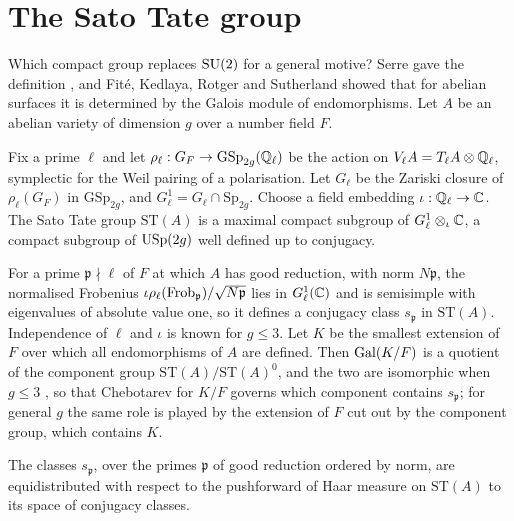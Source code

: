 \section{The Sato Tate group}\label{sec:ch3stgroup}

Which compact group replaces $\mathrm{SU}(2)$ for a general motive? Serre gave the definition \cite{serre2012}, and Fité, Kedlaya, Rotger and Sutherland \cite{fkrs2012} showed that for abelian surfaces it is determined by the Galois module of endomorphisms. Let $A$ be an abelian variety of dimension $g$ over a number field $F$.

\begin{definition}[Serre]\label{def:ch3stgroup}
Fix a prime $\ell$ and let $\rho_\ell:G_F\to\mathrm{GSp}_{2g}(\mathbb{Q}_\ell)$ be the action on $V_\ell A=T_\ell A\otimes\mathbb{Q}_\ell$, symplectic for the Weil pairing of a polarisation. Let $G_\ell$ be the Zariski closure of $\rho_\ell(G_F)$ in $\mathrm{GSp}_{2g}$, and $G^1_\ell=G_\ell\cap\mathrm{Sp}_{2g}$. Choose a field embedding $\iota:\mathbb{Q}_\ell\to\mathbb{C}$. The Sato Tate group $\mathrm{ST}(A)$ is a maximal compact subgroup of $G^1_\ell\otimes_\iota\mathbb{C}$, a compact subgroup of $\mathrm{USp}(2g)$ well defined up to conjugacy.
\end{definition}

For a prime $\mathfrak{p}\nmid\ell$ of $F$ at which $A$ has good reduction, with norm $N\mathfrak{p}$, the normalised Frobenius $\iota\rho_\ell(\operatorname{Frob}_{\mathfrak{p}})/\sqrt{N\mathfrak{p}}$ lies in $G^1_\ell(\mathbb{C})$ and is semisimple with eigenvalues of absolute value one, so it defines a conjugacy class $s_{\mathfrak{p}}$ in $\mathrm{ST}(A)$. Independence of $\ell$ and $\iota$ is known for $g\le3$. Let $K$ be the smallest extension of $F$ over which all endomorphisms of $A$ are defined. Then $\operatorname{Gal}(K/F)$ is a quotient of the component group $\mathrm{ST}(A)/\mathrm{ST}(A)^0$, and the two are isomorphic when $g\le3$ \cite{banaszakkedlaya2015,fkrs2012,sutherland2019}, so that Chebotarev for $K/F$ governs which component contains $s_{\mathfrak{p}}$; for general $g$ the same role is played by the extension of $F$ cut out by the component group, which contains $K$.

\begin{conjecture}\label{conj:ch3gst}
The classes $s_{\mathfrak{p}}$, over the primes $\mathfrak{p}$ of good reduction ordered by norm, are equidistributed with respect to the pushforward of Haar measure on $\mathrm{ST}(A)$ to its space of conjugacy classes.
\end{conjecture}

